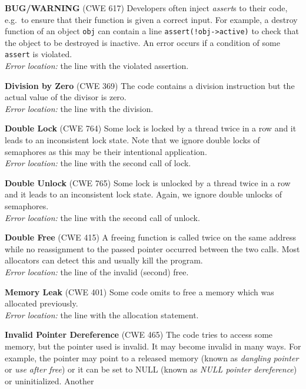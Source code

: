 \documentclass[10pt]{llncs}
\begin{document}
\begin{description}
\item \textbf{BUG/WARNING} (CWE 617) Developers often inject \emph{assert}s
  to their code, e.g.~to ensure that their function is given a correct input.
  For example, a destroy function of an object \texttt{obj} can contain a
  line \texttt{assert(!obj->active)} to check that the object to be
  destroyed is inactive. An error occurs if a condition of some
  \texttt{assert} is violated.\\
  \emph{Error location:} the line with the violated assertion.
\item \textbf{Division by Zero} (CWE 369) The code contains a division
  instruction but the actual value of the divisor
  is zero. \\
  \emph{Error location:} the line with the division.
\item \textbf{Double Lock} (CWE 764) Some lock is locked by a thread twice
  in a row and it leads to an inconsistent lock state. Note that we ignore
  double locks of semaphores as this may be their intentional application.\\
  \emph{Error location:} the line with the second call of lock.
\item \textbf{Double Unlock} (CWE 765) Some lock is unlocked by a thread
  twice in a row and it leads to an
  inconsistent lock state. Again, we ignore double unlocks of semaphores.\\
  \emph{Error location:} the line with the second call of unlock.
\item \textbf{Double Free} (CWE 415) A freeing function is called twice on
  the same address while no reassignment to the passed pointer
  occurred between the two calls. Most allocators can detect this and usually
  kill the program. \\
  \emph{Error location:} the line of the invalid (second) free.
\item \textbf{Memory Leak} (CWE 401)
  Some code omits to free a memory which was allocated previously. \\
  \emph{Error location:} the line with the allocation statement.
\item \textbf{Invalid Pointer Dereference} (CWE 465) The code tries to
  access some memory, but the pointer used is invalid. It may become invalid
  in many ways. For example, the pointer may point to a released memory (known
  as \emph{dangling pointer} or \emph{use after free}) or it can be set to
  NULL (known as \emph{NULL pointer dereference}) or uninitialized. Another

\end{description}
\end{document}
